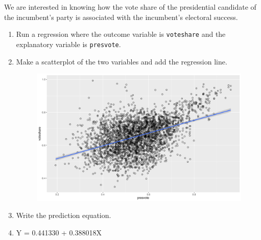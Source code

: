 \documentclass[12pt,letterpaper]{article}
\begin{document}
\noindent We are interested in knowing how the vote share of the presidential candidate of the incumbent's party is associated with the incumbent's electoral success.
	\vspace{.25cm}
	\begin{enumerate}
		\item Run a regression where the outcome variable is \texttt{voteshare} and the explanatory variable is \texttt{presvote}.
		
			\vspace{2cm}
		\item Make a scatterplot of the two variables and add the regression line. 
		\begin{figure}
			\includegraphics[width=0.75\linewidth]{sc_plot3.png}
			\label{Fig3}
		\end{figure}
			\vspace{2cm}
		\item Write the prediction equation.
		\item[] Y = 0.441330 + 0.388018X 
	\end{enumerate}
	

\newpage	
\end{document}
